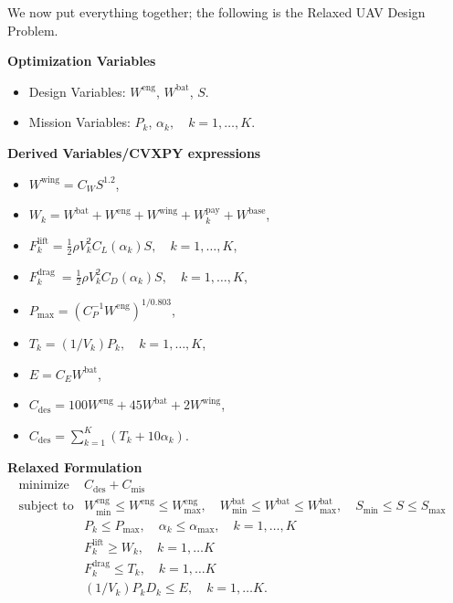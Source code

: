 \documentclass[12pt,reqno]{article}
\theoremstyle{definition}
\numberwithin{equation}{section}
\begin{document}
    \vspace{0.1cm}
    \noindent We now put everything together; the following is the Relaxed UAV Design Problem.

    \noindent\textbf{Optimization Variables}
    \begin{itemize}
        \item Design Variables: $W^{\mathrm{eng}}$, $W^{\mathrm{bat}}$, $S$.
        \item Mission Variables: $P_k$, $\alpha_k, \quad k=1, \ldots, K$.
    \end{itemize}

    \noindent\textbf{Derived Variables/CVXPY expressions}
    \begin{itemize}
        \item $W^{\mathrm{wing}} = C_W S^{1.2}$,
        \item $W_k = W^{\mathrm{bat}} + W^{\mathrm{eng}} + W^{\mathrm{wing}} + W^{\mathrm{pay}}_k + W^{\mathrm{base}}$,
        \item $F_{k}^{\mathrm{lift}} = \frac{1}{2} \rho V_k^2 C_L\left(\alpha_k\right) S, \quad k = 1, \ldots, K$,
        \item $F_k^{\text {drag }}=\frac{1}{2} \rho V_k^2 C_D\left(\alpha_k\right) S, \quad k = 1, \ldots, K$,
        \item $P_{\mathrm{max}} = \left(C_P^{-1} W^{\mathrm{eng}}\right)^{1/0.803}$,
        \item $T_k = \left(1/V_k \right)P_k, \quad k=1, \ldots, K$,
        \item $E = C_{E}W^{\mathrm{bat}}$,
        \item $C_{\mathrm{des}} = 100W^{\mathrm{eng}} + 45W^{\mathrm{bat}} + 2W^{\mathrm{wing}}$,
        \item $C_{\mathrm{des}} = \sum_{k=1}^{K}\left(T_k + 10\alpha_k \right)$.
    \end{itemize}

    \noindent\textbf{Relaxed Formulation}
    \[\begin{array}{lll}
    \text{minimize} \; & C_{\mathrm{des}} + C_{\mathrm{mis}} &  \\
    \text{subject to} 
                      & W_{\min }^{\mathrm{eng}} \leq W^{\mathrm{eng}} \leq W_{\max }^{\mathrm{eng}},
                      \quad W_{\min }^{\mathrm{bat}} \leq W^{\mathrm{bat}} \leq W_{\max }^{\mathrm{bat}}, 
                      \quad S_{\min } \leq S \leq S_{\max } & \\
                      & P_k \le P_{\mathrm{max}}, \quad \alpha_k \le \alpha_{\mathrm{max}}, \quad k = 1, \ldots, K & \\
                      & F_{k}^{\mathrm{lift}} \ge W_k, \quad k = 1, \ldots K & \\
                      & F_{k}^{\mathrm{drag}} \le T_k, \quad k = 1, \ldots K & \\
                        & (1/V_k) P_k D_k \le E, \quad k = 1, \ldots K. & 
    \end{array}\]
\end{document}
